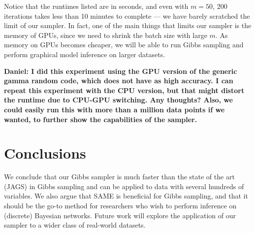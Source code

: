 \documentclass{article} %
\begin{document}
%
%
%

Notice that the runtimes listed are in seconds, and even with $m=50$, 200 iterations takes less than
10 minutes to complete --- we have barely scratched the limit of our sampler. In fact, one of the
main things that limits our sampler is the memory of GPUs, since we need to shrink the batch size
with large $m$. As memory on GPUs becomes cheaper, we will be able to run Gibbs sampling and perform
graphical model inference on larger datasets.

\textbf{Daniel: I did this experiment using the GPU version of the generic gamma random code, which
does not have as high accuracy. I can repeat this experiment with the CPU version, but that might
distort the runtime due to CPU-GPU switching. Any thoughts? Also, we could easily run this with more
than a million data points if we wanted, to further show the capabilities of the sampler.}



\section{Conclusions}\label{sec:conclusions}

We conclude that our Gibbs sampler is much faster than the state of the art (JAGS) in Gibbs sampling
and can be applied to data with several hundreds of variables. We also argue that SAME is beneficial
for Gibbs sampling, and that it should be the go-to method for researchers who wish to perform
inference on (discrete) Bayesian networks. Future work will explore the application of our sampler
to a wider class of real-world datasets.
\end{document}
